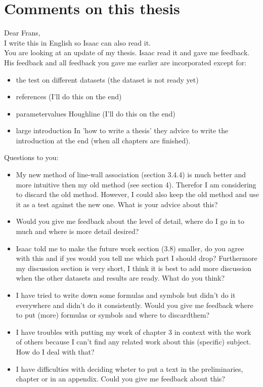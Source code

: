 \section{Comments on this thesis}
Dear Frans,\\

I write this in English so Isaac can also read it.\\
You are looking at an update of my thesis. Isaac read it and gave me feedback. His feedback and all feedback you gave me earlier are incorporated except for:\\
\begin{itemize}
\item the test on different datasets
(the dataset is not ready yet)
\item references
(I'll do this on the end)
\item parametervalues Houghline
(I'll do this on the end)
\item large introduction
In 'how to write a thesis' they advice to write the introduction at the end (when all chapters are finished).
\end{itemize}

Questions to you:\\
\begin{itemize}
\item My new method of line-wall association (section 3.4.4) is much better and
more intuitive then my old method (see section 4). Therefor I am considering to discard the old method. However, I could also keep the old method and use it as
a test against the new one. What is your advice about this?\\
\item Would you give me feedback about the level of detail, where do I go in to much and where is more detail desired?\\
\item Isaac told me to make the future work section (3.8) smaller, do you agree with this and if yes would you tell me which part I should drop?
Furthermore my discussion section is very short, I think it is best to add more discussion when the other datasets and results are ready. What do you think?\\
\item I have tried to write down some formulas and symbols but didn't do it everywhere and didn't do it consistently. Would you give me feedback where to put (more) formulas or symbols and where to discardthem?\\
\item I have troubles with putting my work of chapter 3 in context with the work of others because I can't find any related work about this (specific) subject.  How do I deal with that?\\
\item I have difficulties with deciding wheter to put a text in the preliminaries, chapter or in an appendix. Could you give me feedback about this?
\end{itemize}

